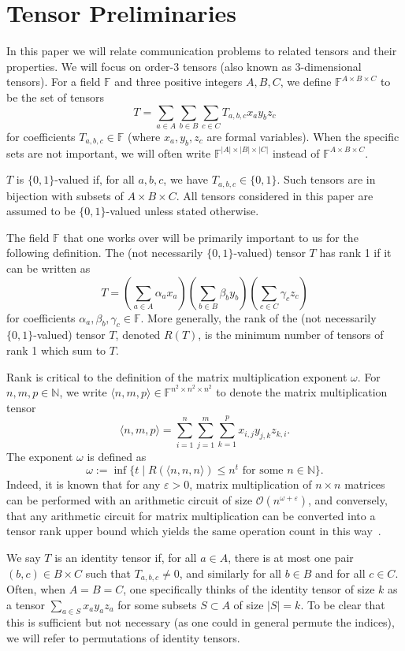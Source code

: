\documentclass[10pt,a4paper]{article}
\newcommand{\F}{\mathbb{F}}
\newcommand{\Oh}{\mathcal{O}}
\begin{document}
\section{Tensor Preliminaries}

In this paper we will relate communication problems to related tensors and their properties. We will focus on order-3 tensors (also known as 3-dimensional tensors). For a field $\F$ and three positive integers $A,B,C$, we define $\F^{A\times B \times C}$ to be the set of tensors $$T = \sum_{a \in A} \sum_{b \in B} \sum_{c \in C} T_{a,b,c} x_a y_b z_c$$ for coefficients $T_{a,b,c} \in \F$ (where $x_a, y_b, z_c$ are formal variables). When the specific sets are not important, we will often write $\F^{|A|\times |B| \times |C|}$ instead of $\F^{A\times B \times C}$.

$T$ is $\{0,1\}$-valued if, for all $a,b,c$, we have $T_{a,b,c} \in \{0,1\}$. Such tensors are in bijection with subsets of $A \times B \times C$. All tensors considered in this paper are assumed to be $\{0,1\}$-valued unless stated otherwise.

The field $\F$ that one works over will be primarily important to us for the following definition. The (not necessarily $\{0,1\}$-valued) tensor $T$ has rank 1 if it can be written as $$T = \left( \sum_{a \in A} \alpha_a x_a \right)\left( \sum_{b \in B} \beta_b y_b \right)\left( \sum_{c \in C} \gamma_c z_c \right)$$ for coefficients $\alpha_a, \beta_b, \gamma_c \in \F$. More generally, the rank of the (not necessarily $\{0,1\}$-valued) tensor $T$, denoted $R(T)$, is the minimum number of tensors of rank 1 which sum to $T$.

Rank is critical to the definition of the matrix multiplication exponent $\omega$. For $n,m,p \in \mathbb{N}$, we write $\langle n,m,p \rangle \in \F^{n^2 \times n^2 \times n^2}$ to denote the matrix multiplication tensor $$\langle n,m,p \rangle = \sum_{i =1}^n \sum_{j=1}^m \sum_{k=1}^p x_{i,j} y_{j,k} z_{k,i}.$$ The exponent $\omega$ is defined as $$\omega := \inf\{ t \mid R(\langle n,n,n \rangle) \leq n^t \text{ for some } n \in \mathbb{N}\}.$$ Indeed, it is known that for any $\varepsilon>0$, matrix multiplication of $n \times n$ matrices can be performed with an arithmetic circuit of size $\Oh(n^{\omega + \varepsilon})$, and conversely, that any arithmetic circuit for matrix multiplication can be converted into a tensor rank upper bound which yields the same operation count in this way~\cite{S73}.


We say $T$ is an identity tensor if, for all $a \in A$, there is at most one pair $(b,c) \in B \times C$ such that $T_{a,b,c} \neq 0$, and similarly for all $b \in B$ and for all $c \in C$. Often, when $A=B=C$, one specifically thinks of the identity tensor of size $k$ as a tensor $\sum_{a \in S} x_a y_a z_a$ for some subsets $S \subset A$ of size $|S|=k$. To be clear that this is sufficient but not necessary (as one could in general permute the indices), we will refer to permutations of identity tensors.
\end{document}
